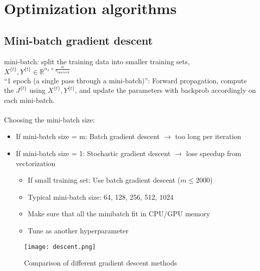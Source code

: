 \section{Optimization algorithms}
\label{sec:Optimization}

%
\subsection{Mini-batch gradient descent}
mini-batch: split the training data into smaller training sets, $X^{\{t\}}, Y^{\{t\}} \in \mathbb{R}^{n_x \times \frac{m}{n_\text{mini-batch}}}$\\
``1 epoch (a single pass through a mini-batch)'': Forward propagation, compute the $J^{\{t\}}$ using $X^{\{t\}}, Y^{\{t\}}$, and update the parameters with backprob accordingly on each mini-batch.
\\\\
Choosing the mini-batch size:
\begin{itemize}
\item
If mini-batch size = m: Batch gradient descent $\rightarrow$ too long per iteration
\item
If mini-batch size = 1: Stochastic gradient descent $\rightarrow$ lose speedup from vectorization

    \begin{itemize}
    \item
    If small training set: Use batch gradient descent ($m \leq 2000$)
    \item
    Typical mini-batch size: 64, 128, 256, 512, 1024
    \item
    Make sure that all the minibatch fit in CPU/GPU memory
    \item
    Tune as another hyperparameter
    \end{itemize}
\end{itemize}

\begin{figure}[h]
    \centering
    \texttt{[image: descent.png]}
    \caption{Comparison of different gradient descent methods}
    \label{fig:descent}
\end{figure}

%
